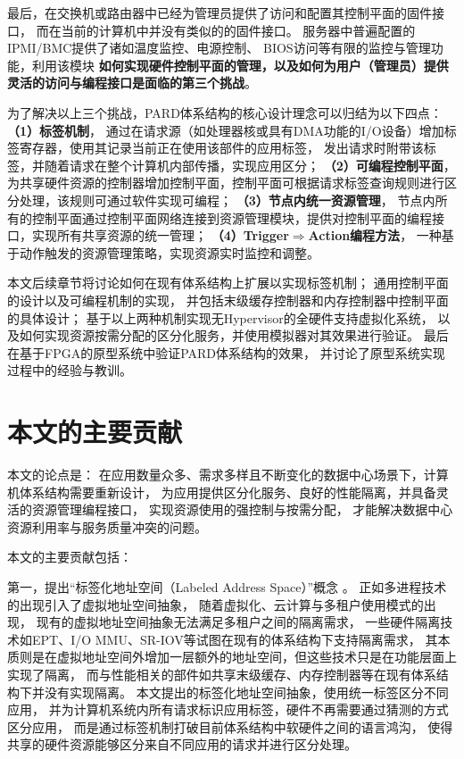 最后，在交换机或路由器中已经为管理员提供了访问和配置其控制平面的固件接口，
而在当前的计算机中并没有类似的的固件接口。
服务器中普遍配置的IPMI/BMC\cite{ipmi}提供了诸如温度监控、电源控制、
BIOS访问等有限的监控与管理功能，利用该模块
\textbf{如何实现硬件控制平面的管理，以及如何为用户（管理员）提供灵活的访问与编程接口是面临的第三个挑战}。

为了解决以上三个挑战，PARD体系结构的核心设计理念可以归结为以下四点：
\textbf{（1）标签机制}，
通过在请求源（如处理器核或具有DMA功能的I/O设备）增加标签寄存器，使用其记录当前正在使用该部件的应用标签，
发出请求时附带该标签，并随着请求在整个计算机内部传播，实现应用区分；
\textbf{（2）可编程控制平面}，
为共享硬件资源的控制器增加控制平面，控制平面可根据请求标签查询规则进行区分处理，该规则可通过软件实现可编程；
\textbf{（3）节点内统一资源管理}，
节点内所有的控制平面通过控制平面网络连接到资源管理模块，提供对控制平面的编程接口，实现所有共享资源的统一管理；
\textbf{（4）Trigger$\Rightarrow$Action编程方法}，
一种基于动作触发的资源管理策略，实现资源实时监控和调整。

本文后续章节将讨论如何在现有体系结构上扩展以实现标签机制；
通用控制平面的设计以及可编程机制的实现，
并包括末级缓存控制器和内存控制器中控制平面的具体设计；
基于以上两种机制实现无Hypervisor的全硬件支持虚拟化系统，
以及如何实现资源按需分配的区分化服务，并使用模拟器对其效果进行验证。
最后在基于FPGA的原型系统中验证PARD体系结构的效果，
并讨论了原型系统实现过程中的经验与教训。


\section{本文的主要贡献}

本文的论点是：
在应用数量众多、需求多样且不断变化的数据中心场景下，计算机体系结构需要重新设计，
为应用提供区分化服务、良好的性能隔离，并具备灵活的资源管理编程接口，
实现资源使用的强控制与按需分配，
才能解决数据中心资源利用率与服务质量冲突的问题。

本文的主要贡献包括：

第一，提出``标签化地址空间（Labeled Address Space）''概念 。
正如多进程技术的出现引入了虚拟地址空间抽象，
随着虚拟化、云计算与多租户使用模式的出现，
现有的虚拟地址空间抽象无法满足多租户之间的隔离需求，
一些硬件隔离技术如EPT、I/O MMU、SR-IOV等试图在现有的体系结构下支持隔离需求，
其本质则是在虚拟地址空间外增加一层额外的地址空间，但这些技术只是在功能层面上实现了隔离，
而与性能相关的部件如共享末级缓存、内存控制器等在现有体系结构下并没有实现隔离。
本文提出的标签化地址空间抽象，使用统一标签区分不同应用，
并为计算机系统内所有请求标识应用标签，硬件不再需要通过猜测的方式区分应用，
而是通过标签机制打破目前体系结构中软硬件之间的语言鸿沟，
使得共享的硬件资源能够区分来自不同应用的请求并进行区分处理。

